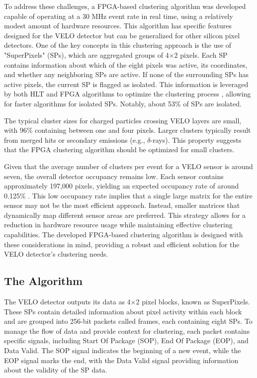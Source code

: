 To address these challenges, a FPGA-based clustering algorithm was developed capable of operating at a 30 MHz event rate in real time, using a relatively modest amount of hardware resources. This algorithm has specific features designed for the VELO detector but can be generalized for other silicon pixel detectors. One of the key concepts in this clustering approach is the use of "SuperPixels" (SPs), which are aggregated groups of 4×2 pixels. Each SP contains information about which of the eight pixels was active, its coordinates, and whether any neighboring SPs are active. If none of the surrounding SPs has active pixels, the current SP is flagged as isolated. This information is leveraged by both HLT and FPGA algorithms to optimize the clustering process , allowing for faster algorithms for isolated SPs. Notably, about 53\% of SPs are isolated.

The typical cluster sizes for charged particles crossing VELO layers are small, with 96\% containing between one and four pixels. Larger clusters typically result from merged hits or secondary emissions (e.g., $\delta$-rays). This property suggests that the FPGA clustering algorithm should be optimized for small clusters.

Given that the average number of clusters per event for a VELO sensor is around seven, the overall detector occupancy remains low. Each sensor contains approximately 197,000 pixels, yielding an expected occupancy rate of around 0.125\% \cite{Bediaga:2013tje}. This low occupancy rate implies that a single large matrix for the entire sensor may not be the most efficient approach. Instead, smaller matrices that dynamically map different sensor areas are preferred. This strategy allows for a reduction in hardware resource usage while maintaining effective clustering capabilities. The developed FPGA-based clustering algorithm is designed with these considerations in mind, providing a robust and efficient solution for the VELO detector's clustering needs.

\subsection*{The Algorithm}
The VELO detector outputs its data as 4×2 pixel blocks, known as SuperPixels. These SPs contain detailed information about pixel activity within each block and are grouped into 256-bit packets called frames, each containing eight SPs. To manage the flow of data and provide context for clustering, each packet contains specific signals, including Start Of Package (SOP), End Of Package (EOP), and Data Valid. The SOP signal indicates the beginning of a new event, while the EOP signal marks the end, with the Data Valid signal providing information about the validity of the SP data.

